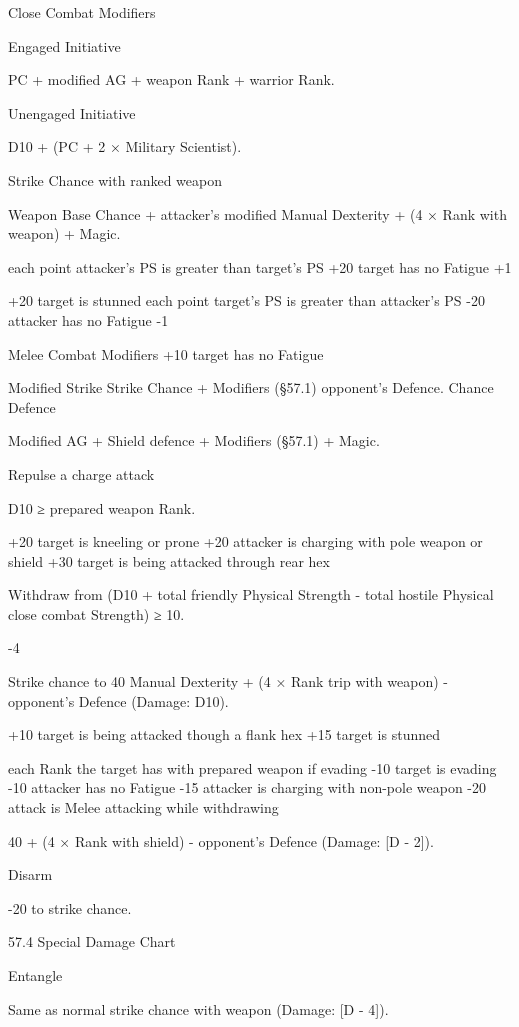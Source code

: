 \documentclass[a4paper]{article}
\begin{document}
\begin{multicols}{3}
Close Combat Modifiers

Engaged
Initiative

PC + modified AG + weapon
Rank + warrior Rank.

Unengaged
Initiative

D10 + (PC + 2 × Military Scientist).

Strike Chance
with ranked
weapon

Weapon Base Chance + attacker’s modified Manual Dexterity + (4 × Rank with weapon)
+ Magic.

each point attacker’s PS is greater than target’s PS
+20 target has no Fatigue
+1

+20 target is stunned
each point target’s PS is greater than attacker’s PS
-20 attacker has no Fatigue
-1

Melee Combat Modifiers
+10 target has no Fatigue

Modified Strike Strike Chance + Modifiers
(§57.1) opponent’s Defence.
Chance
Defence

Modified AG + Shield defence
+ Modifiers (§57.1) + Magic.

Repulse a
charge attack

D10 ≥ prepared weapon Rank.

+20 target is kneeling or prone
+20 attacker is charging with pole weapon or
shield
+30 target is being attacked through rear hex

Withdraw from (D10 + total friendly Physical
Strength - total hostile Physical
close combat
Strength) ≥ 10.

-4

Strike chance to 40%
Manual Dexterity + (4 × Rank
trip
with weapon) - opponent’s
Defence (Damage: D10).

+10 target is being attacked though a flank hex
+15 target is stunned

each Rank the target has with prepared
weapon if evading
-10 target is evading
-10 attacker has no Fatigue
-15 attacker is charging with non-pole weapon
-20 attack is Melee attacking while withdrawing

40%
+ (4 × Rank with shield) - opponent’s Defence (Damage: [D
- 2]).

Disarm

-20 to strike chance.

57.4 Special Damage Chart

Entangle

Same as normal strike chance
with weapon (Damage: [D - 4]).


\end{multicols}
\end{document}

